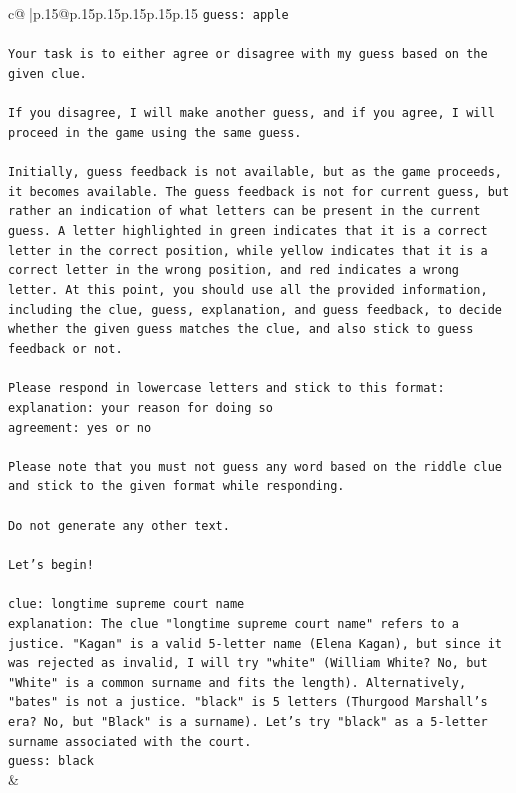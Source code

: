 \documentclass{article}
\begin{document}
{\begin{supertabular}{c@{$\;$}|p{.15\linewidth}@{}p{.15\linewidth}p{.15\linewidth}p{.15\linewidth}p{.15\linewidth}p{.15\linewidth}}
{{{\texttt{guess: apple} \\
\\ 
\texttt{Your task is to either agree or disagree with my guess based on the given clue.} \\
\\ 
\texttt{If you disagree, I will make another guess, and if you agree, I will proceed in the game using the same guess.} \\
\\ 
\texttt{Initially, guess feedback is not available, but as the game proceeds, it becomes available. The guess feedback is not for current guess, but rather an indication of what letters can be present in the current guess. A letter highlighted in green indicates that it is a correct letter in the correct position, while yellow indicates that it is a correct letter in the wrong position, and red indicates a wrong letter. At this point, you should use all the provided information, including the clue, guess, explanation, and guess feedback, to decide whether the given guess matches the clue, and also stick to guess feedback or not.} \\
\\ 
\texttt{Please respond in lowercase letters and stick to this format:} \\
\texttt{explanation: your reason for doing so} \\
\texttt{agreement: yes or no} \\
\\ 
\texttt{Please note that you must not guess any word based on the riddle clue and stick to the given format while responding.} \\
\\ 
\texttt{Do not generate any other text.} \\
\\ 
\texttt{Let's begin!} \\
\\ 
\texttt{clue: longtime supreme court name} \\
\texttt{explanation: The clue "longtime supreme court name" refers to a justice. "Kagan" is a valid 5{-}letter name (Elena Kagan), but since it was rejected as invalid, I will try "white" (William White? No, but "White" is a common surname and fits the length). Alternatively, "bates" is not a justice. "black" is 5 letters (Thurgood Marshall's era? No, but "Black" is a surname). Let's try "black" as a 5{-}letter surname associated with the court.} \\
\texttt{guess: black} \\
            }
        }
    }
    & \\ \\


\end{supertabular}}
\end{document}
